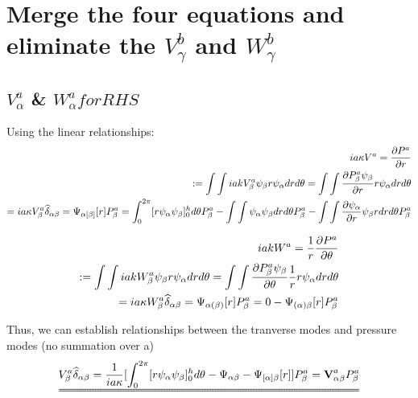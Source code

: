\documentclass{Note}
\begin{document}
\section{Merge the four equations and eliminate the $V_\gamma^{b}$ and $W_\gamma^{b}$}


\subsection{$V_\alpha^a $ \& $W_\alpha^a  for RHS$}

Using the linear relationships:
\begin{equation}
\begin{aligned}
ia\kappa V^a={\partial P^a \over \partial r}\\
:=\int \int iak V_\beta^a\psi_\beta r \psi_\alpha dr d\theta=\int \int {\partial P_\beta^a\psi_\beta\over \partial r} r \psi_\alpha drd\theta\\
=i a \kappa V_\beta^a \widehat{\delta }_{\alpha\beta}=\Psi_{\alpha[\beta]}[r]P_\beta^a=\int_0^{2\pi}[r\psi_\alpha\psi_\beta]_0^h d\theta P_\beta^a-\int\int \psi_\alpha\psi_\beta dr d\theta P_\beta^a- \int\int {\partial \psi_\alpha\over \partial r}\psi_\beta rdr d\theta  P_\beta^a
\end{aligned}
\end{equation}

\begin{equation}
\begin{aligned}
iakW^a={1\over r}{\partial P^a\over \partial \theta}\\
:=\int \int iak W_\beta^a\psi_\beta r \psi_\alpha dr d\theta=\int \int {\partial P_\beta^a\psi_\beta\over \partial \theta}{1\over r} r \psi_\alpha drd\theta\\
=i a \kappa W_\beta^a \widehat{\delta }_{\alpha\beta}=\Psi_{\alpha(\beta)}[r]P_\beta^a=0-\Psi_{(\alpha)\beta}[r]P_\beta^a
\end{aligned}
\end{equation}

Thus, we can establish relationships between the tranverse modes and pressure modes (no summation over a)
\begin{equation}
\begin{aligned}
\uuline{V_\beta^a \widehat{\delta }_{\alpha\beta}={1\over {i a \kappa}}[\int_0^{2\pi}[r\psi_\alpha\psi_\beta]_0^h d\theta -\Psi_{\alpha\beta}- \Psi_{[\alpha]\beta}[r]]P_\beta^a=\textbf{V}_{\alpha\beta}^a P_\beta^a}
\end{aligned}
\end{equation}
\end{document}
